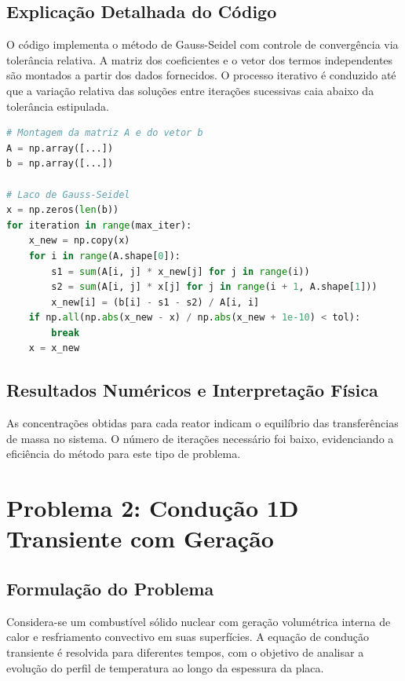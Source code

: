 \documentclass[12pt]{article}
\begin{document}
\subsection{Explicação Detalhada do Código}

O código implementa o método de Gauss-Seidel com controle de convergência via tolerância relativa. A matriz dos coeficientes e o vetor dos termos independentes são montados a partir dos dados fornecidos. O processo iterativo é conduzido até que a variação relativa das soluções entre iterações sucessivas caia abaixo da tolerância estipulada.

\begin{lstlisting}[language=Python, caption=Código - Resolução das concentrações]
# Montagem da matriz A e do vetor b
A = np.array([...])
b = np.array([...])

# Laco de Gauss-Seidel
x = np.zeros(len(b))
for iteration in range(max_iter):
    x_new = np.copy(x)
    for i in range(A.shape[0]):
        s1 = sum(A[i, j] * x_new[j] for j in range(i))
        s2 = sum(A[i, j] * x[j] for j in range(i + 1, A.shape[1]))
        x_new[i] = (b[i] - s1 - s2) / A[i, i]
    if np.all(np.abs(x_new - x) / np.abs(x_new + 1e-10) < tol):
        break
    x = x_new
\end{lstlisting}

\subsection{Resultados Numéricos e Interpretação Física}

As concentrações obtidas para cada reator indicam o equilíbrio das transferências de massa no sistema. O número de iterações necessário foi baixo, evidenciando a eficiência do método para este tipo de problema.

\section{Problema 2: Condução 1D Transiente com Geração}

\subsection{Formulação do Problema}

Considera-se um combustível sólido nuclear com geração volumétrica interna de calor e resfriamento convectivo em suas superfícies. A equação de condução transiente é resolvida para diferentes tempos, com o objetivo de analisar a evolução do perfil de temperatura ao longo da espessura da placa.
\end{document}
